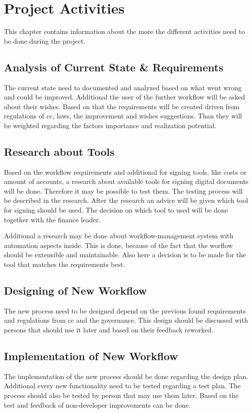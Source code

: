 \chapter{Project Activities}
This chapter contains information about the more the different activities need to be done during the project.

\section{Analysis of Current State \& Requirements}
The current state need to documented and analyzed based on what went wrong and could be improved. Additional the user of the further workflow will be asked about their wishes. Based on that the requirements will be created driven from regulations of \gls{cc}, laws, the improvement and wishes suggestions. Than they will be weighted regarding the factors importance and realization potential.

\section{Research about Tools}
Based on the workflow requirements and additional for signing tools, like costs or amount of accounts, a research about available tools for signing digital documents will be done. Therefore it may be possible to test them. The testing process will be described in the research. After the research an advice will be given which tool for signing should be used. The decision on which tool to used will be done together with the finance leader.

Additional a research may be done about workflow-management system with automation aspects inside. This is done, because of the fact that the worflow should be extensible and maintainable. Also here a decision is to be made for the tool that matches the requirements best. 

\section{Designing of New Workflow}
The new process need to be designed depend on the previous found requirements and regulations from \gls{cc} and the governance. This design should be discussed with persons that should use it later and based on their feedback reworked.

\section{Implementation of New Workflow}
The implementation of the new process should be done regarding the design plan. Additional every new functionality need to be tested regarding a test plan. The process should also be tested by person that may use them later. Based on the test and feedback of non-developer improvements can be done. 